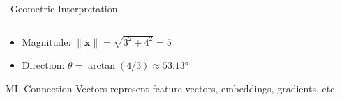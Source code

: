 \documentclass[12pt,aspectratio=169]{beamer}
\begin{document}
\begin{frame}{\faEye \, Geometric Interpretation}
\begin{columns}[T]
\begin{column}{0.5\textwidth}
        \begin{example}[Vector $\mathbf{x} = \begin{bmatrix} 3 \\ 4 \end{bmatrix}$]
            \begin{itemize}
                \item Magnitude: $\|\mathbf{x}\| = \sqrt{3^2 + 4^2} = 5$
                \item Direction: $\theta = \arctan(4/3) \approx 53.13°$
            \end{itemize}
        \end{example}
        
        \begin{alertblock}{ML Connection}
            \small Vectors represent feature vectors, embeddings, gradients, etc.
        \end{alertblock}
    \end{column}
\end{columns}
\end{frame}

\end{document}
